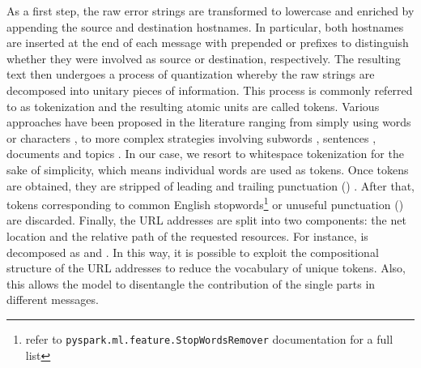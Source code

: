 As a first step, the raw error strings are transformed to lowercase and enriched by appending the source and destination hostnames. In particular, both hostnames are inserted at the end of each message with prepended  or  prefixes to distinguish whether they were involved as source or destination, respectively.
The resulting text then undergoes a process of quantization whereby the raw strings are decomposed into unitary pieces of information.
This process is commonly referred to as tokenization and the resulting atomic units are called tokens. Various approaches have been proposed in the literature ranging from simply using words \cite{bengio2003word, mccann2017word} or characters \cite{ling2015char, dhingra2016char}, to more complex strategies involving subwords \cite{gage1994subword, sennrich2016subword}, sentences \cite{kiros2015sentence}, documents \cite{le2014documents} and topics \cite{niu2015topic}. 
In our case, we resort to whitespace tokenization for the sake of simplicity, which means individual words are used as tokens.
Once tokens are obtained, they are stripped of leading and trailing punctuation \mbox{()}%
.
After that, tokens corresponding to common English stopwords\footnote{refer to \texttt{pyspark.ml.feature.StopWordsRemover} documentation for a full list} or unuseful punctuation \mbox{()} %
are discarded.
Finally, the URL addresses are split into two components: the net location and the relative path of the requested resources. For instance, 
 is decomposed as  and %
.
In this way, it is possible to exploit the compositional structure of the URL addresses to reduce the vocabulary of unique tokens. Also, this allows the model to disentangle the contribution of the single parts in different messages.

